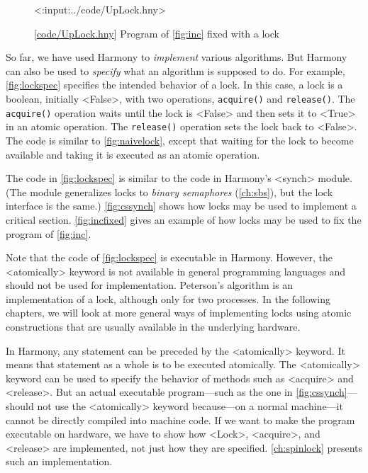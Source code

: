 \documentclass{report}
\newcommand{\harmonylink}[1]{%
[\href{https://harmony.cs.cornell.edu/#1}{\underline{#1}}]%
}
\newenvironment{code}{
\tcolorbox
}{
\endtcolorbox
}
\begin{document}
\begin{figure}
\begin{code}
<{:input:../code/UpLock.hny}>
\end{code}
\caption{\harmonylink{code/UpLock.hny} Program of \autoref{fig:inc} fixed with a lock}
\label{fig:incfixed}
\end{figure}

So far, we have used Harmony to \emph{implement} various algorithms.
But Harmony can also be used to \emph{specify} what an algorithm is
supposed to do.
For example, \autoref{fig:lockspec} specifies the intended behavior
of a lock.
In this case, a lock is a boolean, initially <{False}>,
with two operations, \texttt{acquire()} and \texttt{release()}.
The \texttt{acquire()} operation waits until the lock is <{False}>
and then sets it to <{True}> in an atomic operation.
The \texttt{release()} operation sets the lock back to <{False}>.
The code is similar to \autoref{fig:naivelock}, except that waiting
for the lock to become available and taking it is executed as an
atomic operation.

The code in \autoref{fig:lockspec} is similar to the code in
Harmony's <{synch}> module.
(The module generalizes locks to \emph{binary semaphores}
(\autoref{ch:sbs}), but the lock interface is the same.)
\autoref{fig:cssynch} shows how locks may be used to implement
a critical section.
\autoref{fig:incfixed} gives an example of how locks may be used
to fix the program of \autoref{fig:inc}.

Note that the code of \autoref{fig:lockspec} is executable in Harmony.
However, the <{atomically}> keyword is not available in general
programming languages and should not be used for implementation.
Peterson's algorithm is an implementation of a lock, although only for
two processes.  In the following chapters, we will look at more general
ways of implementing locks using atomic constructions that are usually
available in the underlying hardware.

In Harmony, any statement can be preceded by the <{atomically}>
keyword.  It means that statement as a whole is to be executed atomically.
The <{atomically}> keyword can be used to specify the behavior of
methods such as <{acquire}> and <{release}>.  But
an actual executable program---such as the one in
\autoref{fig:cssynch}---should not use the <{atomically}> keyword
because---on a normal machine---it cannot be directly compiled into
machine code.
If we want to make the program executable on hardware,
we have to show how <{Lock}>, <{acquire}>, and <{release}>
are implemented, not just how they are specified.
\autoref{ch:spinlock} presents such an implementation.
\end{document}
